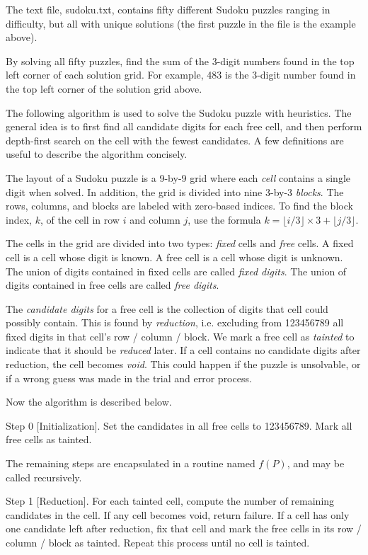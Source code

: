 The text file, sudoku.txt, contains fifty different Sudoku puzzles ranging in difficulty, but all with unique solutions (the first puzzle in the file is the example above).

By solving all fifty puzzles, find the sum of the 3-digit numbers found in the top left corner of each solution grid. For example, 483 is the 3-digit number found in the top left corner of the solution grid above.

\solution

The following algorithm is used to solve the Sudoku puzzle with heuristics. The general idea is to first find all candidate digits for each free cell, and then perform depth-first search on the cell with the fewest candidates. A few definitions are useful to describe the algorithm concisely.

The layout of a Sudoku puzzle is a 9-by-9 grid where each \emph{cell} contains a single digit when solved. In addition, the grid is divided into nine 3-by-3 \emph{blocks}. The rows, columns, and blocks are labeled with zero-based indices. To find the block index, $k$, of the cell in row $i$ and column $j$, use the formula $k = \lfloor i/3 \rfloor \times 3 + \lfloor j / 3 \rfloor$.

The cells in the grid are divided into two types: \emph{fixed} cells and \emph{free} cells. A fixed cell is a cell whose digit is known. A free cell is a cell whose digit is unknown. The union of digits contained in fixed cells are called \emph{fixed digits}. The union of digits contained in free cells are called \emph{free digits}.

The \emph{candidate digits} for a free cell is the collection of digits that cell could possibly contain. This is found by \emph{reduction}, i.e. excluding from 123456789 all fixed digits in that cell's row / column / block. We mark a free cell as \emph{tainted} to indicate that it should be \emph{reduced} later. If a cell contains no candidate digits after reduction, the cell becomes \emph{void}. This could happen if the puzzle is unsolvable, or if a wrong guess was made in the trial and error process.

Now the algorithm is described below.

Step 0 [Initialization]. Set the candidates in all free cells to 123456789. Mark all free cells as tainted.

The remaining steps are encapsulated in a routine named $f(P)$, and may be called recursively.

Step 1 [Reduction]. For each tainted cell, compute the number of remaining candidates in the cell. If any cell becomes void, return failure. If a cell has only one candidate left after reduction, fix that cell and mark the free cells in its row / column / block as tainted. Repeat this process until no cell is tainted.

